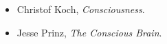 \begin{itemize}[nosep]
  \item Christof Koch, \emph{Consciousness}.
  \item Jesse Prinz, \emph{The Conscious Brain}.
\end{itemize}